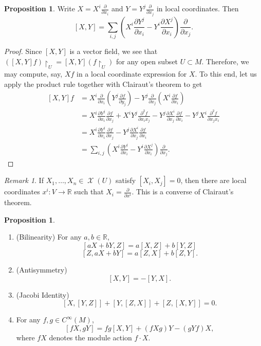 \documentclass[10pt,letterpaper,cm]{nupset}
\theoremstyle{definition}
\theoremstyle{theorem}
\newtheorem{prop}[definition]{Proposition}
\theoremstyle{remark}
\newtheorem{remark}[definition]{Remark}
\newcommand{\R}{\mathbb R}
\newcommand{\1}{\mathbf{1}}
\newcommand{\0}{\vec 0}
\DeclareMathOperator{\vf}{\mathscr{X}}
\begin{document}
\begin{prop}
Write $X = X^i\frac{\partial}{\partial{x_i}}$ and $Y = Y^j \frac{\partial}{\partial{x_j}}$ in local coordinates. Then $$\left[X, Y\right] = \sum_{i, j}\left(X^i \frac{\partial{Y^j}}{\partial{x_i}} - Y^i\frac{\partial{X^j}}{\partial{x_i}}\right)\frac{\partial}{\partial{x_j}}.$$
\end{prop}
\begin{proof}
Since $\left[X, Y\right]$ is a vector field, we see that $\left(\left[X, Y\right]f\right) \restriction_U = \left[X, Y\right](f\restriction_U)$ for any open subset $U \subset M$. Therefore, we may compute, say, $Xf$ in a local coordinate expression for $X$.  To this end, let us apply the product rule together with Clairaut's theorem to get
\begin{align*}
\left[X, Y\right]f & = X^i \frac{\partial}{\partial{x_i}} \left(Y^j \frac{\partial{f}}{\partial{y_j}}\right) - Y^j \frac{\partial}{\partial{x_j}} \left(X^i \frac{\partial{f}}{\partial{x_i}}\right) 
\\ & =  X^i \frac{\partial{Y^j}}{\partial{x_i}}\frac{\partial{f}}{\partial{x_j}} + X^i Y^j \frac{\partial^2{f}}{\partial{x_i}{x_j}} - Y^j \frac{\partial{X^i}}{\partial{x_j}}\frac{\partial{f}}{\partial{x_i}} - Y^j X^i \frac{\partial^2{f}}{\partial{x_j}{x_i}}
 \\ & = X^i \frac{\partial{Y^j}}{\partial{x_i}}\frac{\partial{f}}{\partial{x_j}} -  Y^j \frac{\partial{X^i}}{\partial{x_j}}\frac{\partial{f}}{\partial{x_i}} 
 \\ & = \sum_{i, j}\left(X^i \frac{\partial{Y^j}}{\partial{x_i}} - Y^i\frac{\partial{X^j}}{\partial{x_i}}\right)\frac{\partial}{\partial{x_j}}.
 \end{align*}
\end{proof}

\begin{remark}
If $X_1, \ldots, X_n \in \vf(U)$ satisfy $[X_i, X_j]= 0$, then there are local coordinates $x^i : V \to \R$ such that $X_i  =\frac{\partial}{\partial{x^i}}$. This is a converse of Clairaut's theorem.
\end{remark}

\begin{prop} $ $
\begin{enumerate}
\item (Bilinearity) For any $a,b \in \R$, $$[aX + bY, Z] = a[X, Z] + b[Y, Z]$$ $$[Z, aX + bY] = a[Z, X] + b[Z, Y]. $$ 
\item (Antisymmetry) $$\left[X, Y\right] = {-[Y,X]}.$$
\item (Jacobi Identity) $$\left[X, [Y, Z]\right]+ \left[Y, [Z, X]\right] + \left[Z, \left[X, Y\right]\right] =0  . $$
\item For any $f, g \in C^{\infty}(M)$, $$[fX, gY] = fg\left[X, Y\right] + \left(fXg\right)Y - \left(gYf\right)X, $$ where $fX$ denotes the module action $f \cdot X$.
\end{enumerate}
\end{prop}
\end{document}
